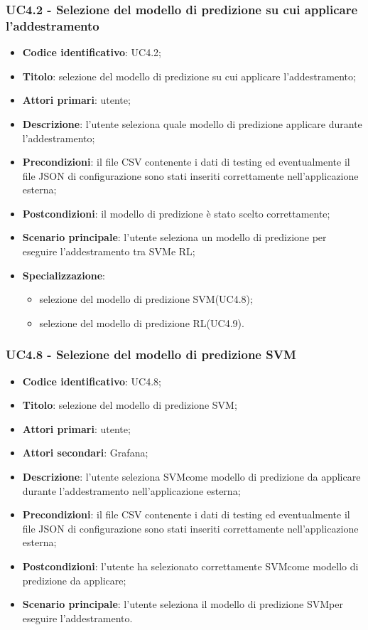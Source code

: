 \subsubsection{UC4.2 - Selezione del modello di predizione su cui applicare l'addestramento}
\begin{itemize}
    \item \textbf{Codice identificativo}: UC4.2;
    \item \textbf{Titolo}: selezione del modello di predizione su cui applicare l'addestramento;
    \item \textbf{Attori primari}: utente;
    \item \textbf{Descrizione}: l'utente seleziona quale modello di predizione applicare durante l'addestramento;
    \item \textbf{Precondizioni}: il file CSV contenente i dati di testing ed eventualmente il file JSON di configurazione sono stati inseriti correttamente nell'applicazione esterna;
    \item \textbf{Postcondizioni}: il modello di predizione è stato scelto correttamente;
    \item \textbf{Scenario principale}: l'utente seleziona un modello di predizione per eseguire l'addestramento tra SVM\glosp e RL\glo;
    \item \textbf{Specializzazione}:
    \begin{itemize}
    	\item selezione del modello di predizione SVM\glosp (UC4.8);
    	\item selezione del modello di predizione RL\glosp (UC4.9).
    \end{itemize}   
\end{itemize}
\subsubsection{UC4.8 - Selezione del modello di predizione SVM}
\begin{itemize}
	\item \textbf{Codice identificativo}: UC4.8;
	\item \textbf{Titolo}: selezione del modello di predizione SVM\glo;
	\item \textbf{Attori primari}: utente;
	\item \textbf{Attori secondari}: Grafana\glo;
	\item \textbf{Descrizione}: l'utente seleziona SVM\glosp come modello di predizione da applicare durante l'addestramento nell'applicazione esterna;
	\item \textbf{Precondizioni}: il file CSV contenente i dati di testing ed eventualmente il file JSON di configurazione sono stati inseriti correttamente nell'applicazione esterna;
	\item \textbf{Postcondizioni}: l'utente ha selezionato correttamente SVM\glosp come modello di predizione da applicare;
	\item \textbf{Scenario principale}: l'utente seleziona il modello di predizione SVM\glosp per eseguire l'addestramento.
\end{itemize}
